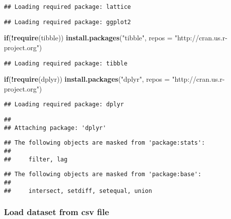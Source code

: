 \documentclass[]{article}
\newenvironment{Shaded}{\begin{snugshade}}{\end{snugshade}}
\newcommand{\KeywordTok}[1]{\textcolor[rgb]{0.13,0.29,0.53}{\textbf{#1}}}
\newcommand{\DataTypeTok}[1]{\textcolor[rgb]{0.13,0.29,0.53}{#1}}
\newcommand{\StringTok}[1]{\textcolor[rgb]{0.31,0.60,0.02}{#1}}
\newcommand{\ControlFlowTok}[1]{\textcolor[rgb]{0.13,0.29,0.53}{\textbf{#1}}}
\newcommand{\OperatorTok}[1]{\textcolor[rgb]{0.81,0.36,0.00}{\textbf{#1}}}
\newcommand{\NormalTok}[1]{#1}
\begin{document}
\begin{verbatim}
## Loading required package: lattice
\end{verbatim}

\begin{verbatim}
## Loading required package: ggplot2
\end{verbatim}

\begin{Shaded}
\begin{Highlighting}[]
\ControlFlowTok{if}\NormalTok{(}\OperatorTok{!}\KeywordTok{require}\NormalTok{(tibble)) }\KeywordTok{install.packages}\NormalTok{(}\StringTok{"tibble"}\NormalTok{, }\DataTypeTok{repos =} \StringTok{"http://cran.us.r-project.org"}\NormalTok{)}
\end{Highlighting}
\end{Shaded}

\begin{verbatim}
## Loading required package: tibble
\end{verbatim}

\begin{Shaded}
\begin{Highlighting}[]
\ControlFlowTok{if}\NormalTok{(}\OperatorTok{!}\KeywordTok{require}\NormalTok{(dplyr)) }\KeywordTok{install.packages}\NormalTok{(}\StringTok{"dplyr"}\NormalTok{, }\DataTypeTok{repos =} \StringTok{"http://cran.us.r-project.org"}\NormalTok{)}
\end{Highlighting}
\end{Shaded}

\begin{verbatim}
## Loading required package: dplyr
\end{verbatim}

\begin{verbatim}
## 
## Attaching package: 'dplyr'
\end{verbatim}

\begin{verbatim}
## The following objects are masked from 'package:stats':
## 
##     filter, lag
\end{verbatim}

\begin{verbatim}
## The following objects are masked from 'package:base':
## 
##     intersect, setdiff, setequal, union
\end{verbatim}

\subsubsection{Load dataset from csv
file}\label{load-dataset-from-csv-file}
\end{document}
